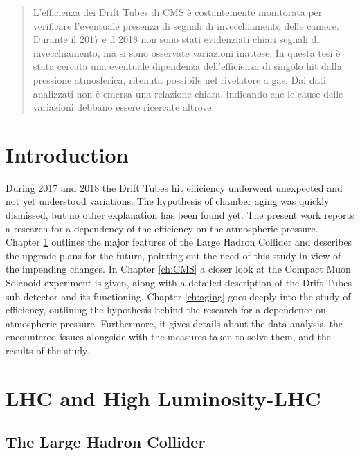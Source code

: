 \documentclass[12pt,twoside,a4paper]{report}
\numberwithin{equation}{section}
\begin{document}
\newpage\null\thispagestyle{empty}\newpage
\begin{abstract}
L'efficienza dei Drift Tubes di CMS è costantemente monitorata per verificare l'eventuale presenza di segnali di invecchiamento delle camere.
Durante il 2017 e il 2018 non sono stati evidenziati chiari segnali di invecchiamento, ma si sono osservate variazioni inattese.
In questa tesi è stata cercata una eventuale dipendenza dell'efficienza di singolo hit dalla pressione atmosferica, ritenuta possibile nel rivelatore a gas.
Dai dati analizzati non è emersa una relazione chiara, indicando che le cause delle variazioni debbano essere ricercate altrove.
\end{abstract}
\newpage\null\thispagestyle{empty}\newpage
\tableofcontents

\newpage\null\thispagestyle{empty}\newpage
{}
\chapter*{Introduction}
During 2017 and 2018 the Drift Tubes hit efficiency underwent unexpected and not yet understood variations. The hypothesis of chamber aging was quickly dismissed, but no other explanation has been found yet.
The present work reports a research for a dependency of the efficiency on the atmospheric pressure.
Chapter \ref{ch:LHC} outlines the major features of the Large Hadron Collider and describes the upgrade plans for the future, pointing out the need of this study in view of the impending changes.
In Chapter \ref{ch:CMS} a closer look at the Compact Muon Solenoid experiment is given, along with a detailed description of the Drift Tubes sub-detector and its functioning.
Chapter \ref{ch:aging} goes deeply into the study of efficiency, outlining the hypothesis behind the research for a dependence on atmospheric pressure. Furthermore, it gives details about the data analysis, the encountered issues alongside with the measures taken to solve them, and the results of the study.


\newpage\null\thispagestyle{empty}\newpage
\chapter{LHC and High Luminosity-LHC}
\label{ch:LHC}
\section{The Large Hadron Collider}
\end{document}

